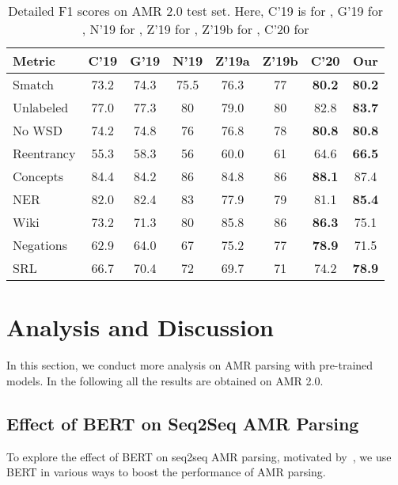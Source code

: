 \documentclass[11pt,a4paper]{article}
\begin{document}
\begin{table}[th]
    \setlength{\tabcolsep}{2pt}
    \centering
    \small
    \begin{tabular}{l|cccccc|c}
    \hline
    \bf{Metric} & \bf{C'19} & \bf{G'19} & \bf{N'19} & \bf{Z'19a} & \bf{Z'19b} & \bf{C'20} & \bf{Our} \\
    \hline
    Smatch       & 73.2 & 74.3 & 75.5 & 76.3 & 77 & \bf{80.2} & \bf{80.2} \\
    \hline
    Unlabeled    & 77.0 & 77.3 & 80   & 79.0 & 80 & 82.8      & \bf{83.7} \\
    No WSD       & 74.2 & 74.8 & 76   & 76.8 & 78 & \bf{80.8} & \bf{80.8} \\
    Reentrancy   & 55.3 & 58.3 & 56   & 60.0 & 61 & 64.6      & \bf{66.5} \\
    Concepts     & 84.4 & 84.2 & 86   & 84.8 & 86 & \bf{88.1} & 87.4 \\
    NER          & 82.0 & 82.4 & 83   & 77.9 & 79 & 81.1      & \bf{85.4} \\
    Wiki         & 73.2 & 71.3 & 80   & 85.8 & 86 & \bf{86.3} & 75.1 \\
    Negations    & 62.9 & 64.0 & 67   & 75.2 & 77 & \bf{78.9} & 71.5 \\
    SRL          & 66.7 & 70.4 & 72   & 69.7 & 71 & 74.2      & \bf{78.9} \\
    \hline
    \end{tabular}
    \caption{Detailed F1 scores on AMR 2.0 test set. Here, C'19 is for \citet{cai_lam_emnlp_2019}, G'19 for \citet{ge_etal_ijcai_2019}, N'19 for \citet{naseem_etal_acl_2019}, Z'19 for \citet{zhang_etal_acl_2019}, Z'19b for \citet{zhang_etal_emnlp_2019}, C'20 for \citet{cai_lam_acl_2020}
    }
    \label{tbl:detailed_comparison}
\end{table}


\section{Analysis and Discussion}
\label{sect:analsysi}
In this section, we conduct more analysis on AMR parsing with pre-trained models. In the following all the results are obtained on AMR 2.0.

\subsection{Effect of BERT on Seq2Seq AMR Parsing}
\label{sect:bert4amr}
To explore the effect of BERT on seq2seq AMR parsing, motivated by~\citet{zhu_etal_iclr_2020}, we use BERT in various ways to boost the performance of AMR parsing. 
\end{document}
